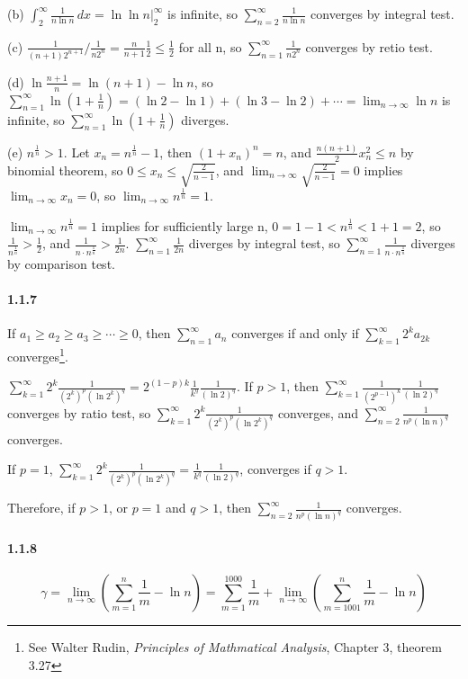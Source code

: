 \documentclass[a4paper]{article}
\begin{document}
(b) $\int_2^\infty \frac{1}{n\ln n}\,dx=\ln \ln n\bigr |_2^\infty$ is infinite, so $\sum_{n=2}^{\infty} \frac{1}{n\ln n}$ converges by integral test.
\medskip

(c) $\frac{1}{(n+1)2^{n+1}}/\frac{1}{n2^n}=\frac{n}{n+1}\frac{1}{2}\leq \frac{1}{2}$ for all n, so $\sum_{n=1}^\infty \frac{1}{n2^n}$ converges by retio test.
\medskip

(d) $\ln \frac{n+1}{n}=\ln (n+1)-\ln n$, so $\sum_{n=1}^\infty \ln (1+\frac{1}{n})=(\ln2-\ln1)+(\ln3-\ln2)+\cdots=\lim_{n\to\infty} \ln n$ is infinite, so $\sum_{n=1}^\infty \ln (1+\frac{1}{n})$ diverges.
\medskip

(e) $n^{\frac{1}{n}}>1$. Let $x_n=n^{\frac{1}{n}}-1$, then $(1+x_n)^n=n$, and $\frac{n(n+1)}{2}x_n^2\leq n$ by binomial theorem, so $0\leq x_n \leq \sqrt{\frac{2}{n-1}}$, and $\lim_{n\to\infty}\sqrt{\frac{2}{n-1}}=0$ implies $\lim_{n\to\infty}x_n=0$, so $\lim_{n\to\infty}n^{\frac{1}{n}}=1$.

$\lim_{n\to\infty}n^{\frac{1}{n}}=1$ implies for sufficiently large n, $0=1-1<n^{\frac{1}{n}}<1+1=2$, so $\frac{1}{n^{\frac{1}{n}}}>\frac{1}{2}$, and $\frac{1}{n\cdot n^{\frac{1}{n}}}>\frac{1}{2n}$. $\sum_{n=1}^\infty \frac{1}{2n}$ diverges by integral test, so $\sum_{n=1}^\infty \frac{1}{n\cdot n^{\frac{1}{n}}}$ diverges by comparison test.

\paragraph{1.1.7}
If $a_1\geq a_2\geq a_3 \geq \cdots \geq 0$, then $\sum_{n=1}^\infty a_n$ converges if and only if $\sum_{k=1}^\infty2^ka_{2k}$ converges\footnote{See Walter Rudin, \textit{Principles of Mathmatical Analysis}, Chapter 3, theorem 3.27}. 

$\sum_{k=1}^\infty 2^k \frac{1}{(2^k)^p(\ln 2^k)^q}=2^{(1-p)k}\frac{1}{k^q}\frac{1}{(\ln2)^q}$. If $p>1$, then $\sum_{k=1}^\infty \frac{1}{(2^{p-1})^k}\frac{1}{(\ln 2)^q}$ converges by ratio test, so $\sum_{k=1}^\infty 2^k \frac{1}{(2^k)^p(\ln 2^k)^q}$ converges, and $\sum_{n=2}^\infty \frac{1}{n^p(\ln n)^q}$ converges. 

If $p=1$, $\sum_{k=1}^\infty 2^k \frac{1}{(2^k)^p(\ln 2^k)^q}=\frac{1}{k^q}\frac{1}{(\ln2)^q}$, converges if $q>1$.

Therefore, if $p>1$, or $p=1$ and $q>1$, then $\sum_{n=2}^\infty \frac{1}{n^p(\ln n)^q}$ converges.

\paragraph{1.1.8}
\[\gamma=\lim_{n\to\infty}(\sum_{m=1}^n\frac{1}{m}-\ln n)=\sum_{m=1}^{1000}\frac{1}{m}+\lim_{n\to\infty}(\sum_{m=1001}^n\frac{1}{m}-\ln n)\]
\end{document}
